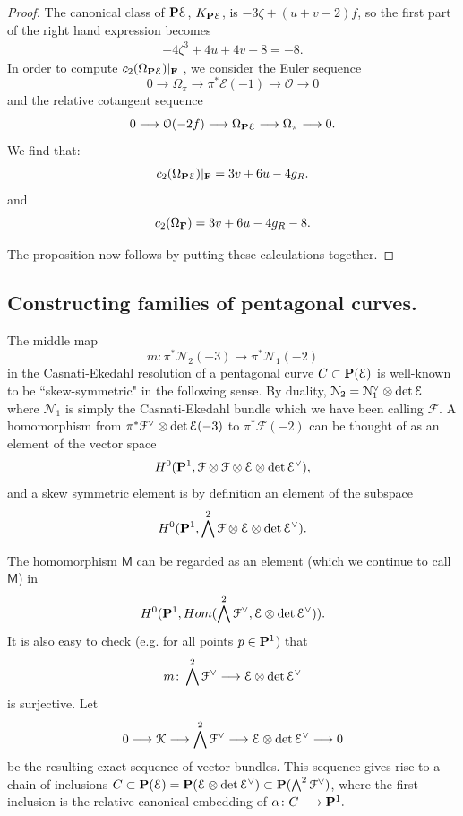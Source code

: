 \documentclass[reqno, 10 pt]{article}
\theoremstyle{definition}
\theoremstyle{remark}
\numberwithin{equation}{section}
\numberwithin{thm}{section}
\numberwithin{prop}{section}
\numberwithin{lem}{section}
\numberwithin{cor}{section}
\numberwithin{conj}{section}
\numberwithin{defn}{section}
\newcommand{\F}{{\mathbf F}}
\renewcommand{\to}{\longrightarrow}
\newcommand{\sfM}{{\mathsf M}}
\newcommand{\cE}{{\mathcal E}}
\newcommand{\cF}{{\mathcal F}}
\newcommand{\cK}{{\mathcal K}}
\newcommand{\cN}{{\mathcal N}}
\newcommand{\cO}{{\mathcal O}}
\renewcommand{\P}{{\bf P}}
\renewcommand{\F}{{\bf F}}
\newcommand {\from}{{\colon}}
\begin{document}
\begin{proof}
The canonical class of ${\bf P}\cE$, $K_{{\bf P}\cE}$, is $-3\zeta + (u+v - 2)f$, so the first part of the right hand expression becomes
\begin{eqnarray*}
-4\zeta^3 + 4u +4v - 8 = -8 .
\end{eqnarray*}
In order to compute  $c_2(\Omega_{{\bf P}\cE})|_{\F}$ , we consider the Euler sequence \[0 \to \Omega_{\pi} \to \pi^{*}\cE(-1) \to \cO \to 0\] and the relative cotangent sequence \[0 \to \cO(-2f) \to \Omega_{{\bf P}\cE} \to  \Omega_{\pi} \to 0.\]
We find that: 
\begin{eqnarray*}
c_2(\Omega_{{\bf P}\cE})|_{\F} = 3v + 6u - 4g_R.
\end{eqnarray*}
and  \[c_2(\Omega_{\F}) = 3v + 6u - 4g_R - 8.\] 

The proposition now follows by putting these calculations together.
\end{proof}



\subsection{Constructing families of pentagonal curves.} 
The middle map
\begin{equation}
m \from \pi^{*}\cN_{2}(-3) \to \pi^{*}\cN_{1}(-2)
\end{equation}
in the Casnati-Ekedahl resolution of a pentagonal curve $C \subset \P(\cE)$ is well-known \cite{casnati:five} to be  ``skew-symmetric" in the following sense. By duality, $\cN_{2} = \dual{\cN_{1}} \otimes \det \cE$ where $\cN_{1}$ is simply the Casnati-Ekedahl bundle which we have been calling $\cF$.   A homomorphism from $\pi^{*}\dual{\cF}\otimes \det{\cE}(-3)$ to $\pi^{*}\cF(-2)$  can be thought of as an element of the vector space \[H^{0}(\P^{1}, \cF\otimes \cF \otimes \cE \otimes \det \dual{\cE}),\]  and a skew symmetric element is by definition an element of the subspace \[H^{0}(\P^{1}, \bigwedge^{2}\cF \otimes \cE \otimes \det \dual{\cE}).\]

The homomorphism $\sfM$ can be regarded as an element (which we continue to call $\sfM$) in \[H^{0}(\P^{1}, Hom(\bigwedge^{2}\dual{\cF}, \cE \otimes \det \dual{\cE})).\]   It is also easy to check (e.g. for all points $p \in \P^{1}$) that \[m \from \bigwedge^{2}\dual{\cF} \to \cE \otimes \det \dual{\cE}\] is surjective. Let 
\begin{equation}\label{pentseq}
0 \to \cK \to \bigwedge^{2}\dual{\cF} \to \cE \otimes \det \dual{\cE} \to 0
\end{equation}  be the resulting exact sequence of vector bundles.  This sequence gives rise to a chain of inclusions $C \subset \P(\cE) = \P(\cE \otimes \det \dual{\cE}) \subset \P(\bigwedge^{2}\dual{\cF})$, where the first inclusion is the relative canonical embedding of $\alpha \from C \to \P^{1}.$
\end{document}
